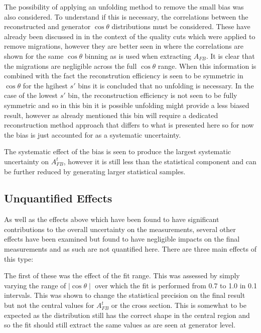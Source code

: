 The possibility of applying an unfolding method\cite{Schmitt:2016orm} to remove the small bias was also considered. To understand if this is necessary, the correlations between the reconstructed and generator $\cos\theta$ distributions must be considered. These have already been discussed in  in the context of the quality cuts which were applied to remove migrations, however they are better seen in  where the correlations are shown for the same $\cos\theta$ binning as is used when extracting $A_{FB}$. It is clear that the migrations are negligible across the full $\cos\theta$ range. When this information is combined with the fact the reconstrution efficiency is seen to be symmetric in $\cos\theta$ for the hgihest $s'$ bins it is concluded that no unfolding is necessary. In the case of the lowest $s'$ bin, the reconstruction efficiency is not seen to be fully symmetric and so in this bin it is possible unfolding might provide a less biased result, however as already mentioned this bin will require a dedicated reconstruction method approach that differs to what is presented here so for now the bias is just accounted for as a systematic uncertainty.

The systematic effect of the bias is seen to produce the largest systematic uncertainty on $A_{FB}^t$, however it is still less than the statistical component and can be further reduced by generating larger statistical samples.

\subsection{Unquantified Effects}

As well as the effects above which have been found to have significant contributions to the overall uncertainty on the measurements, several other effects have been examined but found to have negligible impacts on the final measurements and as such are not quantified here. There are three main effects of this type:

The first of these was the effect of the fit range. This was assessed by simply varying the range of $\mid\cos\theta\mid$ over which the fit is performed from 0.7 to 1.0 in 0.1 intervals. This was shown to change the statistical precision on the final result but not the central values for $A_{FB}^t$ or the cross section. This is somewhat to be expected as the distribution still has the correct shape in the central region and so the fit should still extract the same values as are seen at generator level.

